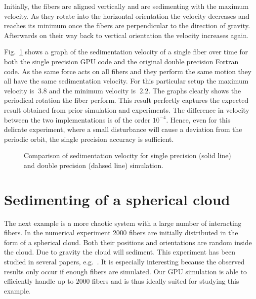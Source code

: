 Initially, the fibers are aligned vertically and are sedimenting with the maximum velocity. As they rotate into the horizontal orientation the velocity decreases and reaches its minimum once the fibers are perpendicular to the direction of gravity. Afterwards on their way back to vertical orientation the velocity increases again.

Fig.~\ref{fig:ring_sedimentation_velocity} shows a graph of the sedimentation velocity of a single fiber over time for both the single precision GPU code and the original double precision Fortran code. As the same force acts on all fibers and they perform the same motion they all have the same sedimentation velocity. For this particular setup the maximum velocity is $~3.8$ and the minimum velocity is $~2.2$. The graphs clearly shows the periodical rotation the fiber perform. This result perfectly captures the expected result obtained from prior simulation and experiments. The difference in velocity between the two implementations is of the order $10^{-4}$. Hence, even for this delicate experiment, where a small disturbance will cause a deviation from the periodic orbit, the single precision accuracy is sufficient.

\begin{figure}[!htbp]
  \centering
  \caption[Comparison of sedimentation velocity for single- and double-precision simulation.]{Comparison of sedimentation velocity for single precision (solid line) and double precision (dahsed line) simulation.}
  \label{fig:ring_sedimentation_velocity}
\end{figure}

\section{Sedimenting of a spherical cloud}
\label{sec:example_sphere}

The next example is a more chaotic system with a large number of interacting fibers. In the numerical experiment $2000$ fibers are initially distributed in the form of a spherical cloud. Both their positions and orientations are random inside the cloud. Due to gravity the cloud will sediment. This experiment has been studied in several papers, e.g.~\cite{Bulow2015}\cite{Metzger2007}\cite{Park2010}. It is especially interesting because the observed results only occur if enough fibers are simulated. Our GPU simulation is able to efficiently handle up to $2000$ fibers and is thus ideally suited for studying this example.

